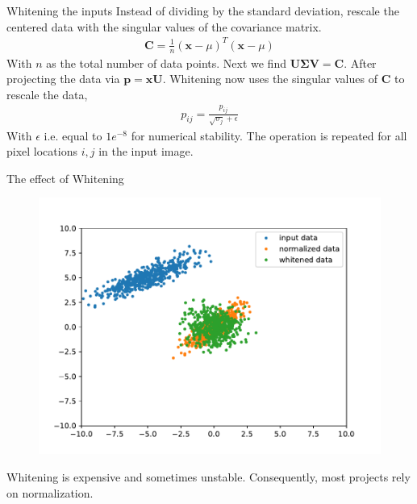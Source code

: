 \documentclass{beamer}
\begin{document}
    \begin{frame}{Whitening the inputs \cite{CS231n}}
      Instead of dividing by the standard deviation, rescale the centered data with the singular values of the covariance matrix.
      \begin{align}
        \mathbf{C} = \frac{1}{n} (\mathbf{x} - \mu)^T(\mathbf{x} - \mu)
      \end{align}
      With $n$ as the total number of data points. Next we find $\mathbf{U}\mathbf{\Sigma}\mathbf{V} = \mathbf{C}$.
      After projecting the data via $\mathbf{p} = \mathbf{x}\mathbf{U}$. Whitening now uses the singular values of $\mathbf{C}$ to rescale the data,
      \begin{align}
        p_{ij} = \frac{p_{ij}}{\sqrt{\sigma_j} + \epsilon}
      \end{align}
      With $\epsilon$ i.e. equal to $1e^{-8}$ for numerical stability.
      The operation is repeated for all pixel locations $i,j$ in the input image.
    \end{frame}

    \begin{frame}{The effect of Whitening}
    \begin{figure}
    \includegraphics[width=\linewidth]{./figures/whitened.pdf}
      \end{figure}
      Whitening is expensive and sometimes unstable. Consequently, most projects rely on normalization.
    \end{frame}
\end{document}
